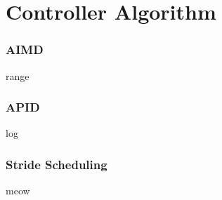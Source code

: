 \section{Controller Algorithm}

\subsubsection{AIMD}
range
\subsubsection{APID}
log
\subsubsection{Stride Scheduling}
meow
